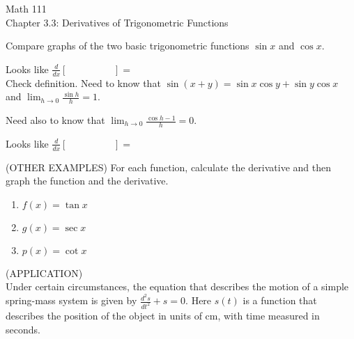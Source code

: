 \documentclass[11pt]{article}
\begin{document}
\begin{center}
\Large
\rm{Math 111}
\\
\rm{Chapter 3.3:  Derivatives of Trigonometric Functions}
\\
\end{center}
\vspace{0.2in}

Compare graphs of the two basic trigonometric functions $\sin{x}$ and $\cos{x}$.\\

\vspace{2.5in}


Looks like $\frac{d}{dx}[ \hspace{2cm} ] = $ \\

Check definition.  Need to know that $\sin{(x+y)} = \sin{x}\cos{y}+\sin{y}\cos{x}$
and $\lim_{h\to 0}\frac{\sin{h}}{h} = 1$.

\vspace{2.5in}

Need also to know that $\lim_{h\to 0}\frac{\cos{h}-1}{h} = 0$.

\vspace{0.1in}





\pagebreak

Looks like $\frac{d}{dx}[ \hspace{2cm} ] = $ \\


\vspace{2in}



(OTHER EXAMPLES)  For each function, calculate the derivative and then
graph the function and the derivative.



\begin{enumerate}
\item{$f(x) = \tan{x}$}
  \vspace{2in}
\item{$g(x) = \sec{x}$}
  \vspace{2in}
\item{$p(x) = \cot{x}$}
  \vspace{2in}
\end{enumerate}

\pagebreak

(APPLICATION)\\

Under certain circumstances, the equation that describes the motion of a simple
spring-mass system is given by $\frac{d^2s}{dt^2} + s = 0$.  Here $s(t)$ is a function that describes the position of the object
in units of cm, with time measured in seconds.
\end{document}
